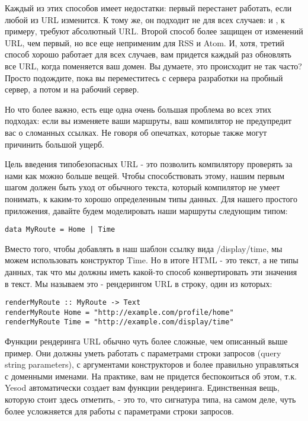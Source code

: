 Каждый из этих способов имеет недостатки: первый перестанет работать, если 
любой из URL изменится. К тому же, он подходит не для всех случаев: 
 и , к примеру, требуют абсолютный URL. Второй способ
более защищен от изменений URL, чем первый, но все еще неприменим для RSS и Atom.
И, хотя, третий способ хорошо работает для всех случаев, вам придется каждый раз
обновлять все URL, когда поменяется ваш домен. Вы думаете, это происходит не так
часто? Просто подождите, пока вы переместитесь с сервера разработки на пробный
сервер, а потом и на рабочий сервер.

Но что более важно, есть еще одна очень большая проблема во всех этих подходах:
если вы изменяете ваши маршруты, ваш компилятор не предупредит вас о сломанных
ссылках. Не говоря об опечатках, которые также могут причинить большой ущерб.

Цель введения типобезопасных URL - это позволить компилятору проверять за 
нами как можно больше вещей. Чтобы способствовать этому, нашим первым шагом 
должен быть уход от обычного текста, который компилятор не умеет понимать, 
к каким-то хорошо определенным типы данных. Для нашего простого приложения,
давайте будем моделировать наши маршруты следующим типом:

\begin{lstlisting}
data MyRoute = Home | Time
\end{lstlisting}

Вместо того, чтобы добавлять в наш шаблон ссылку вида /display/time, мы можем
использовать конструктор Time. Но в итоге HTML - это текст, а не типы данных,
так что мы должны иметь какой-то способ конвертировать эти значения в текст.
Мы называем это - рендерингом URL в строку, один из которых:

\begin{lstlisting}
renderMyRoute :: MyRoute -> Text
renderMyRoute Home = "http://example.com/profile/home"
renderMyRoute Time = "http://example.com/display/time"
\end{lstlisting}

Функции рендеринга URL обычно чуть более сложные, чем описанный выше пример.
Они должны уметь работать с параметрами строки запросов (query string parameters),
с аргументами конструкторов и более правильно управляться с доменными именами.
На практике, вам не придется беспокоиться об этом, т.к. Yesod автоматически 
создает вам функции рендеринга. Единственная вещь, которую стоит здесь отметить,
 - это то, что сигнатура типа, на самом деле, чуть более усложняется для 
работы с параметрами строки запросов.

